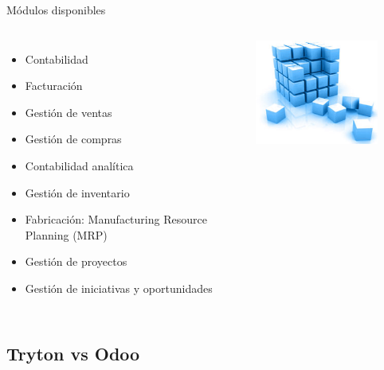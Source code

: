     \begin{frame}{Módulos disponibles}
        \fontsize{10}{11}\selectfont
        \begin{columns}
            \begin{itemize}
                \item Contabilidad
                \item Facturación
                \item Gestión de ventas
                \item Gestión de compras
                \item Contabilidad analítica
                \item Gestión de inventario
                \item Fabricación: Manufacturing Resource Planning (MRP)
                \item Gestión de proyectos
                \item Gestión de iniciativas y oportunidades
            \end{itemize}
            \begin{center}
            \includegraphics[width=0.8\textwidth]{./Images/modules.jpg}
            \end{center}
        \end{columns}
	\end{frame}

    \subsection{Tryton vs Odoo}

